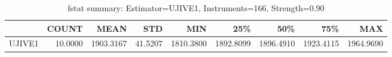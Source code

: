 \begin{table}[ht]
\centering
\caption{fstat summary: Estimator=UJIVE1, Instruments=166, Strength=0.90}
\begin{tabular}{lrrrrrrrr}
\toprule
 & COUNT & MEAN & STD & MIN & 25\% & 50\% & 75\% & MAX \\
\midrule
UJIVE1 & 10.0000 & 1903.3167 & 41.5207 & 1810.3800 & 1892.8099 & 1896.4910 & 1923.4115 & 1964.9690 \\
\bottomrule
\end{tabular}
\end{table}
